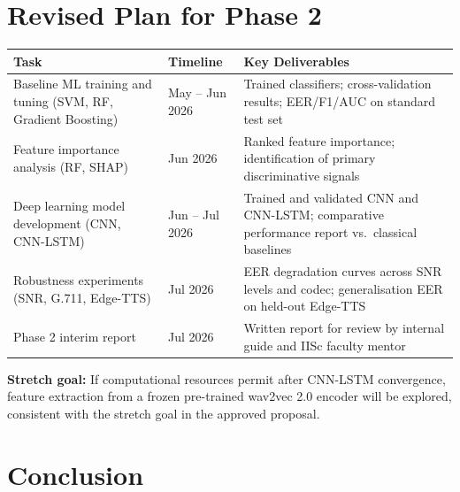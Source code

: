 \documentclass[12pt,a4paper]{report}
\begin{document}
\chapter{Revised Plan for Phase 2}

\begin{center}
\begin{tabular}{L{4.5cm}C{2cm}L{6.5cm}}
  \toprule
  \color{white}\textbf{Task} &
  \color{white}\textbf{Timeline} &
  \color{white}\textbf{Key Deliverables} \\
  \midrule
  Baseline ML training and tuning (SVM, RF, Gradient Boosting) &
  May -- Jun 2026 &
  Trained classifiers; cross-validation results; EER/F1/AUC on standard test set \\[4pt]
  Feature importance analysis (RF, SHAP) &
  Jun 2026 &
  Ranked feature importance; identification of primary discriminative signals \\[4pt]
  Deep learning model development (CNN, CNN-LSTM) &
  Jun -- Jul 2026 &
  Trained and validated CNN and CNN-LSTM; comparative performance report vs.\
  classical baselines \\[4pt]
  Robustness experiments (SNR, G.711, Edge-TTS) &
  Jul 2026 &
  EER degradation curves across SNR levels and codec; generalisation EER on
  held-out Edge-TTS \\[4pt]
  Phase 2 interim report &
  Jul 2026 &
  Written report for review by internal guide and IISc faculty mentor \\
  \bottomrule
\end{tabular}
\end{center}

\medskip
\begin{infobox}
  \textbf{Stretch goal:} If computational resources permit after CNN-LSTM convergence,
  feature extraction from a frozen pre-trained wav2vec 2.0 encoder will be explored,
  consistent with the stretch goal in the approved proposal.
\end{infobox}

\chapter{Conclusion}
\end{document}
